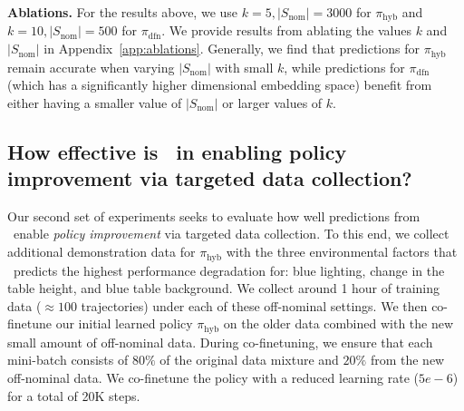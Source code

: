 {\bf Ablations.} For the results above, we use $k=5, |S_\text{nom}| = 3000$ for $\pi_\text{hyb}$ and $k=10, |S_\text{nom}| = 500$ for $\pi_\text{dfn}$.  We provide results from ablating the values $k$ and $|S_\text{nom}|$ in Appendix~\ref{app:ablations}. Generally, we find that predictions for $\pi_\text{hyb}$ remain accurate when varying $|S_\text{nom}|$ with small $k$, while predictions for $\pi_\text{dfn}$ (which has a significantly higher dimensional embedding space) benefit from either having a smaller value of $|S_\text{nom}|$ or larger values of $k$. 

\subsection{How effective is \redit~in enabling policy improvement via targeted data collection?}
\label{subsec:targeted-data-collection}


Our second set of experiments seeks to evaluate how well predictions from \redit~enable \emph{policy improvement} via targeted data collection. To this end, we collect additional demonstration data for $\pi_\text{hyb}$ with the three environmental factors that \redit~predicts the highest performance degradation for: blue lighting, change in the table height, and blue table background.
We collect around 1 hour of training data ($\approx 100$ trajectories) under each of these off-nominal settings. We then co-finetune our initial learned policy $\pi_\text{hyb}$ on the older data combined with the new small amount of off-nominal data. During co-finetuning, we ensure that each mini-batch consists of $80\%$ of the original data mixture and $20\%$ from the new off-nominal data. We co-finetune the policy with a reduced learning rate ($5e-6$) for a total of 20K steps.  

